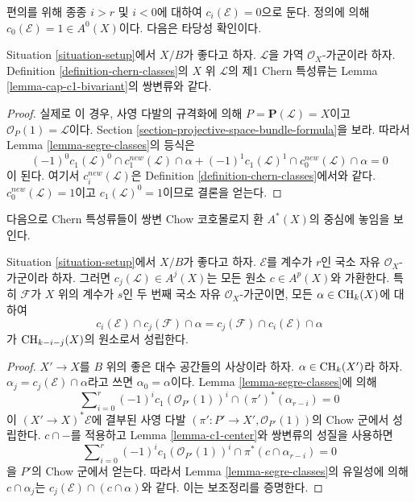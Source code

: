 \noindent
편의를 위해 종종 $i > r$ 및 $i < 0$에 대하여
$c_i(\mathcal{E}) = 0$으로 둔다. 정의에 의해
$c_0(\mathcal{E}) = 1 \in A^0(X)$이다.
다음은 타당성 확인이다.

\begin{lemma}
\label{lemma-first-chern-class}
Situation \ref{situation-setup}에서 $X/B$가 좋다고 하자.
$\mathcal{L}$을 가역 $\mathcal{O}_X$-가군이라 하자.
Definition \ref{definition-chern-classes}의 $X$ 위
$\mathcal{L}$의 제1 Chern 특성류는 Lemma
\ref{lemma-cap-c1-bivariant}의 쌍변류와 같다.
\end{lemma}

\begin{proof}
실제로 이 경우, 사영 다발의 규격화에 의해
$P = \mathbf{P}(\mathcal{L}) = X$이고
$\mathcal{O}_P(1) = \mathcal{L}$이다. Section
\ref{section-projective-space-bundle-formula}을 보라.
따라서 Lemma \ref{lemma-segre-classes}의 등식은
$$
(-1)^0 c_1(\mathcal{L})^0 \cap c^{new}_1(\mathcal{L}) \cap \alpha +
(-1)^1 c_1(\mathcal{L})^1 \cap c^{new}_0(\mathcal{L}) \cap \alpha = 0
$$
이 된다. 여기서 $c_i^{new}(\mathcal{L})$은 Definition
\ref{definition-chern-classes}에서와 같다.
$c_0^{new}(\mathcal{L}) = 1$이고 $c_1(\mathcal{L})^0 = 1$이므로
결론을 얻는다.
\end{proof}

\noindent
다음으로 Chern 특성류들이 쌍변 Chow 코호몰로지 환
$A^*(X)$의 중심에 놓임을 보인다.

\begin{lemma}
\label{lemma-cap-commutative-chern}
Situation \ref{situation-setup}에서 $X/B$가 좋다고 하자.
$\mathcal{E}$를 계수가 $r$인 국소 자유 $\mathcal{O}_X$-가군이라 하자.
그러면 $c_j(\mathcal{L}) \in A^j(X)$는 모든 원소
$c \in A^p(X)$와 가환한다.
특히 $\mathcal{F}$가 $X$ 위의 계수가 $s$인 두 번째 국소 자유
$\mathcal{O}_X$-가군이면, 모든 $\alpha \in \mathop{\mathrm{CH}}\nolimits_k(X)$에 대하여
$$
c_i(\mathcal{E}) \cap c_j(\mathcal{F}) \cap \alpha
=
c_j(\mathcal{F}) \cap c_i(\mathcal{E}) \cap \alpha
$$
가 $\mathop{\mathrm{CH}}\nolimits_{k - i - j}(X)$의 원소로서 성립한다.
\end{lemma}

\begin{proof}
$X' \to X$를 $B$ 위의 좋은 대수 공간들의 사상이라 하자.
$\alpha \in \mathop{\mathrm{CH}}\nolimits_k(X')$라 하자.
$\alpha_j = c_j(\mathcal{E}) \cap \alpha$라고 쓰면
$\alpha_0 = \alpha$이다. Lemma \ref{lemma-segre-classes}에 의해
$$
\sum\nolimits_{i = 0}^r
(-1)^i c_1(\mathcal{O}_{P'}(1))^i \cap
(\pi')^*(\alpha_{r - i}) = 0
$$
이 $(X' \to X)^*\mathcal{E}$에 결부된 사영 다발
$(\pi' : P' \to X', \mathcal{O}_{P'}(1))$의 Chow 군에서 성립한다.
$c \cap -$를 적용하고 Lemma \ref{lemma-c1-center}와 쌍변류의
성질을 사용하면
$$
\sum\nolimits_{i = 0}^r
(-1)^i c_1(\mathcal{O}_{P'}(1))^i \cap
\pi^*(c \cap \alpha_{r - i}) = 0
$$
을 $P'$의 Chow 군에서 얻는다.
따라서 Lemma \ref{lemma-segre-classes}의 유일성에 의해
$c \cap \alpha_j$는 $c_j(\mathcal{E}) \cap (c \cap \alpha)$와 같다.
이는 보조정리를 증명한다.
\end{proof}

